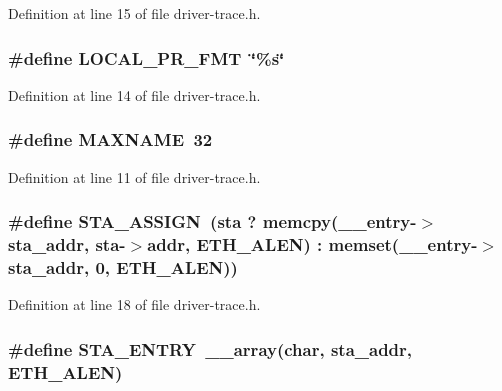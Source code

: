 Definition at line 15 of file driver-\/trace.\-h.

\hypertarget{driver-trace_8h_a09833af423135e21ffe99a59ae088cf1}{
\subsubsection[{L\-O\-C\-A\-L\-\_\-\-P\-R\-\_\-\-F\-M\-T}]{\setlength{\rightskip}{0pt plus 5cm}\#define L\-O\-C\-A\-L\-\_\-\-P\-R\-\_\-\-F\-M\-T~\char`\"{}\%s\char`\"{}}}\label{driver-trace_8h_a09833af423135e21ffe99a59ae088cf1}


Definition at line 14 of file driver-\/trace.\-h.

\hypertarget{driver-trace_8h_ac881f02a50b29d3ffa5b1f4a0e4f9568}{
\subsubsection[{M\-A\-X\-N\-A\-M\-E}]{\setlength{\rightskip}{0pt plus 5cm}\#define M\-A\-X\-N\-A\-M\-E~32}}\label{driver-trace_8h_ac881f02a50b29d3ffa5b1f4a0e4f9568}


Definition at line 11 of file driver-\/trace.\-h.

\hypertarget{driver-trace_8h_abbd837b5fc444c0cb48b5954f8ad068a}{
\subsubsection[{S\-T\-A\-\_\-\-A\-S\-S\-I\-G\-N}]{\setlength{\rightskip}{0pt plus 5cm}\#define S\-T\-A\-\_\-\-A\-S\-S\-I\-G\-N~(sta ? memcpy(\-\_\-\-\_\-entry-\/$>$sta\-\_\-addr, sta-\/$>$addr, E\-T\-H\-\_\-\-A\-L\-E\-N) \-: memset(\-\_\-\-\_\-entry-\/$>$sta\-\_\-addr, 0, E\-T\-H\-\_\-\-A\-L\-E\-N))}}\label{driver-trace_8h_abbd837b5fc444c0cb48b5954f8ad068a}


Definition at line 18 of file driver-\/trace.\-h.

\hypertarget{driver-trace_8h_a8e20dfda2de8535eb923ec3900c01034}{
\subsubsection[{S\-T\-A\-\_\-\-E\-N\-T\-R\-Y}]{\setlength{\rightskip}{0pt plus 5cm}\#define S\-T\-A\-\_\-\-E\-N\-T\-R\-Y~\-\_\-\-\_\-array(char, sta\-\_\-addr, E\-T\-H\-\_\-\-A\-L\-E\-N)}}\label{driver-trace_8h_a8e20dfda2de8535eb923ec3900c01034}


